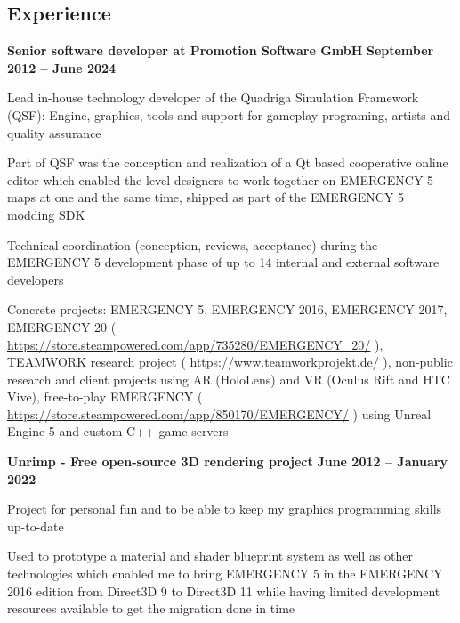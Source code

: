 \documentclass[margin,line]{Ofenberg_Resume}
\begin{document}
\begin{resume}
	\section{\mysidestyle Experience}
	\textbf{Senior software developer at Promotion Software GmbH} \hfill \textbf{September 2012 -- June 2024}\vspace{-3mm}\\\vspace{-1mm}%
	\begin{list2}
		\item Lead in-house technology developer of the Quadriga Simulation Framework (QSF): Engine, graphics, tools and support for gameplay programing, artists and quality assurance
		\item Part of QSF was the conception and realization of a Qt based cooperative online editor which enabled the level designers to work together on EMERGENCY 5 maps at one and the same time, shipped as part of the EMERGENCY 5 modding SDK
		\item Technical coordination (conception, reviews, acceptance) during the EMERGENCY 5 development phase of up to 14 internal and external software developers
		\item Concrete projects: EMERGENCY 5, EMERGENCY 2016, EMERGENCY 2017, EMERGENCY 20 ( \url{https://store.steampowered.com/app/735280/EMERGENCY_20/} ), TEAMWORK research project ( \url{https://www.teamworkprojekt.de/} ), non-public research and client projects using AR (HoloLens) and VR (Oculus Rift and HTC Vive), free-to-play EMERGENCY ( \url{https://store.steampowered.com/app/850170/EMERGENCY/} ) using Unreal Engine 5 and custom C++ game servers
	\end{list2}\vspace{-1.5mm}
	\textbf{Unrimp - Free open-source 3D rendering project} \hfill \textbf{June 2012 -- January 2022}\vspace{-3mm}\\\vspace{-1mm}%
	\begin{list2}
		\item Project for personal fun and to be able to keep my graphics programming skills up-to-date
		\item Used to prototype a material and shader blueprint system as well as other technologies which enabled me to bring EMERGENCY 5 in the EMERGENCY 2016 edition from Direct3D 9 to Direct3D 11 while having limited development resources available to get the migration done in time
	\end{list2}\vspace{-1.5mm}

\end{resume}
\end{document}
